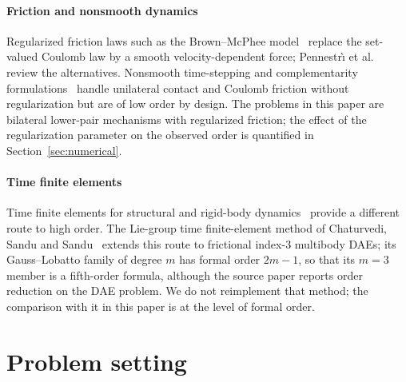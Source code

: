 \documentclass[preprint,12pt]{elsarticle}
\begin{document}
\paragraph{Friction and nonsmooth dynamics}
Regularized friction laws such as the Brown--McPhee model~\cite{browmcphee2016friction} replace the
set-valued Coulomb law by a smooth velocity-dependent force; Pennestr\`{\i} et
al.~\cite{pennestri2016review} review the alternatives. Nonsmooth time-stepping and complementarity
formulations~\cite{stewart1996implicit,anitescu1997formulating,tasora2011matrixfree} handle
unilateral contact and Coulomb friction without regularization but are of low order by design. The
problems in this paper are bilateral lower-pair mechanisms with regularized friction; the effect of
the regularization parameter on the observed order is quantified in Section~\ref{sec:numerical}.

\paragraph{Time finite elements}
Time finite elements for structural and rigid-body dynamics~\cite{borri1988rigid,hughes1988spacetime,hulbert1992time,kim2017higher,jog2016robust,bauchau2024time}
provide a different route to high order. The Lie-group time finite-element method of Chaturvedi,
Sandu and Sandu~\cite{chaturvedi2026tfe} extends this route to frictional index-3 multibody DAEs;
its Gauss--Lobatto family of degree $m$ has formal order $2m-1$, so that its $m=3$ member is a
fifth-order formula, although the source paper reports order reduction on the DAE problem. We do
not reimplement that method; the comparison with it in this paper is at the level of formal order.

\section{Problem setting}
\label{sec:setting}
\end{document}

